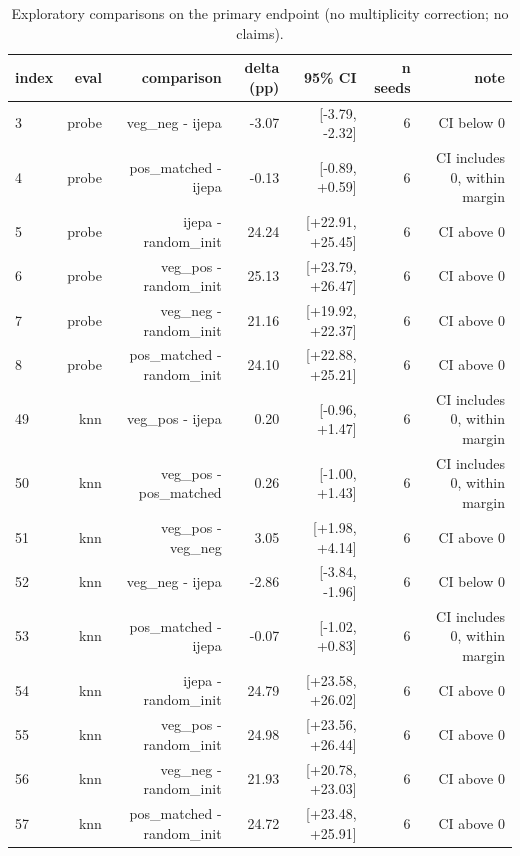 \begin{table}[t]
\centering
\small
\caption{Exploratory comparisons on the primary endpoint (no multiplicity correction; no claims).}
\label{tab:exploratory_comparisons}
\begin{tabular}{lrrrrrr}
\toprule
index & eval & comparison & delta (pp) & 95\% CI & n seeds & note \\
\midrule
3 & probe & veg\_neg - ijepa & -3.07 & [-3.79, -2.32] & 6 & CI below 0 \\
4 & probe & pos\_matched - ijepa & -0.13 & [-0.89, +0.59] & 6 & CI includes 0, within margin \\
5 & probe & ijepa - random\_init & 24.24 & [+22.91, +25.45] & 6 & CI above 0 \\
6 & probe & veg\_pos - random\_init & 25.13 & [+23.79, +26.47] & 6 & CI above 0 \\
7 & probe & veg\_neg - random\_init & 21.16 & [+19.92, +22.37] & 6 & CI above 0 \\
8 & probe & pos\_matched - random\_init & 24.10 & [+22.88, +25.21] & 6 & CI above 0 \\
49 & knn & veg\_pos - ijepa & 0.20 & [-0.96, +1.47] & 6 & CI includes 0, within margin \\
50 & knn & veg\_pos - pos\_matched & 0.26 & [-1.00, +1.43] & 6 & CI includes 0, within margin \\
51 & knn & veg\_pos - veg\_neg & 3.05 & [+1.98, +4.14] & 6 & CI above 0 \\
52 & knn & veg\_neg - ijepa & -2.86 & [-3.84, -1.96] & 6 & CI below 0 \\
53 & knn & pos\_matched - ijepa & -0.07 & [-1.02, +0.83] & 6 & CI includes 0, within margin \\
54 & knn & ijepa - random\_init & 24.79 & [+23.58, +26.02] & 6 & CI above 0 \\
55 & knn & veg\_pos - random\_init & 24.98 & [+23.56, +26.44] & 6 & CI above 0 \\
56 & knn & veg\_neg - random\_init & 21.93 & [+20.78, +23.03] & 6 & CI above 0 \\
57 & knn & pos\_matched - random\_init & 24.72 & [+23.48, +25.91] & 6 & CI above 0 \\
\bottomrule
\end{tabular}
\end{table}
